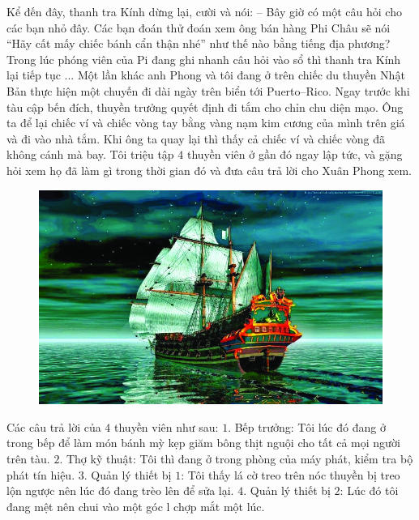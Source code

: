 	\vskip 0.1cm
	Kể đến đây, thanh tra Kính dừng lại, cười và nói:
	\vskip 0.1cm
	--	Bây giờ có một câu hỏi cho các bạn nhỏ đây. Các bạn đoán thử đoán xem ông bán hàng Phi Châu sẽ nói “Hãy cất mấy chiếc bánh cẩn thận nhé” như thế nào bằng tiếng địa phương? 
	\vskip 0.1cm
	Trong lúc phóng viên của Pi đang ghi nhanh câu hỏi vào sổ thì thanh tra Kính lại tiếp tục ...
	\vskip 0.1cm
	\textbf{\color{toancuabi}{DU HÀNH TRÊN ĐẠI DƯƠNG}}
	\vskip 0.1cm
	Một lần khác anh Phong và tôi đang ở trên chiếc du thuyền Nhật Bản thực hiện một chuyến đi dài ngày trên biển tới Puerto--Rico. Ngay trước khi tàu cập bến đích, thuyền trưởng quyết định đi tắm cho chỉn chu diện mạo. Ông ta để lại chiếc ví và chiếc vòng tay bằng vàng nạm kim cương của mình trên giá và đi vào nhà tắm. Khi ông ta quay lại thì thấy cả chiếc ví và chiếc vòng đã không cánh mà bay. Tôi triệu tập $4$ thuyền viên ở gần đó ngay lập tức, và gặng hỏi xem họ đã làm gì trong thời gian đó và đưa câu trả lời cho Xuân Phong xem. 
		\begin{figure}[H]
			\centering
			\vspace*{-5pt}
			\captionsetup{labelformat= empty, justification=centering}
			\includegraphics[width=0.7\linewidth]{3}
			\vspace*{-10pt}
		\end{figure}
	Các câu trả lời của $4$ thuyền viên như sau: 
	\vskip 0.1cm
	$1.$ Bếp trưởng: Tôi lúc đó đang ở trong bếp để làm món bánh mỳ kẹp giăm bông thịt nguội cho tất cả mọi người trên tàu. 
	\vskip 0.1cm
	$2.$ Thợ kỹ thuật: Tôi thì đang ở trong phòng của máy phát, kiểm tra bộ phát tín hiệu. 
	\vskip 0.1cm
	$3.$ Quản lý thiết bị $1$: Tôi thấy lá cờ treo trên nóc thuyền bị treo lộn ngược nên lúc đó đang trèo lên để sửa lại. 
	\vskip 0.1cm
	$4.$ Quản lý thiết bị $2$: Lúc đó tôi đang mệt nên chui vào một góc l chợp mắt một lúc. 
